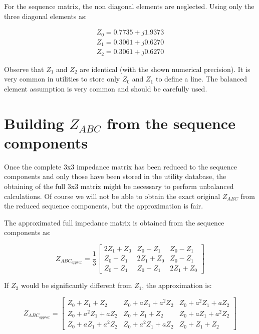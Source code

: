 \documentclass[nols,a4paper,twoside,notoc,fleqn]{tufte-book}
\begin{document}
For the sequence matrix, the non diagonal elements are neglected. Using only the three diagonal elements as:

$$
\begin{array}{c}
Z_0 = 0.7735 + j 1.9373 \\
Z_1 = 0.3061 + j 0.6270 \\
Z_2 = 0.3061  +  j 0.6270
\end{array}
$$

Observe that $Z_1$ and $Z_2$ are identical (with the shown numerical precision). It is very common in utilities to store only $Z_0$ and $Z_1$ to define a line. The balanced element assumption is very common and should be carefully used.

\section{Building $Z_{ABC}$ from the sequence components}

Once the complete 3x3 impedance matrix has been reduced to the sequence components and only those have been stored in the utility database, the obtaining of the full 3x3 matrix might be necessary to perform unbalanced calculations. Of course we will not be able to obtain the exact original $Z_{ABC}$ from the reduced sequence components, but the approximation is fair.

The approximated full impedance matrix is obtained from the sequence components as:

\begin{equation}
Z_{ABC_{approx}} = \frac{1}{3}\left[ \begin{array}{ccc}
2Z_1 + Z_0 & Z_0 - Z_1 & Z_0 - Z_1 \\
Z_0 - Z_1 & 2Z_1 + Z_0 & Z_0 - Z_1 \\ 
Z_0 - Z_1 & Z_0 - Z_1 & 2Z_1 + Z_0
\end{array} \right]
\end{equation}

If $Z_2$ would be significantly different from $Z_1$, the approximation is:

\begin{equation}
Z_{ABC_{approx}} = \left[ \begin{array}{ccc}
Z_0+Z_1+Z_2  & Z_0 +a Z_1 +a^2 Z_2 & Z_0 +a^2 Z_1 +a Z_2 \\
Z_0 +a^2 Z_1 +a Z_2 & Z_0+Z_1+Z_2 & Z_0 +a Z_1 +a^2 Z_2 \\ 
Z_0 +a Z_1 +a^2 Z_2 & Z_0 +a^2 Z_1 +a Z_2 & Z_0+Z_1+Z_2
\end{array} \right]
\end{equation}
\end{document}
